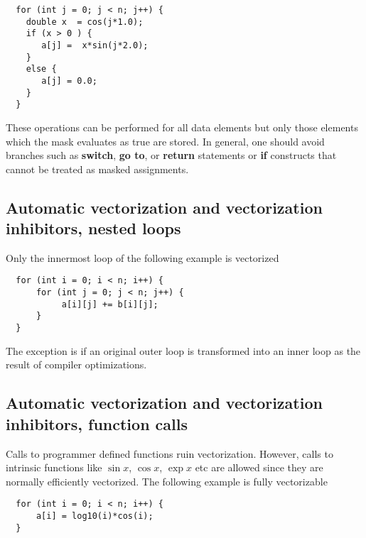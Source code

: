 \begin{verbatim}
  for (int j = 0; j < n; j++) {
    double x  = cos(j*1.0);
    if (x > 0 ) {
       a[j] =  x*sin(j*2.0); 
    }
    else {
       a[j] = 0.0;
    }
  }

\end{verbatim}

These operations can be performed for all data elements but only those elements which the mask evaluates as true are stored. In general, one should avoid branches such as \textbf{switch}, \textbf{go to}, or \textbf{return} statements or \textbf{if} constructs that cannot be treated as masked assignments. 

\subsection*{Automatic vectorization and vectorization inhibitors, nested loops}

Only the innermost loop of the following example is vectorized






\begin{verbatim}
  for (int i = 0; i < n; i++) {
      for (int j = 0; j < n; j++) {
           a[i][j] += b[i][j];
      }  
  }

\end{verbatim}

The exception is if an original outer loop is transformed into an inner loop as the result of compiler optimizations.

\subsection*{Automatic vectorization and vectorization inhibitors, function calls}

Calls to programmer defined functions ruin vectorization. However, calls to intrinsic functions like
$\sin{x}$, $\cos{x}$, $\exp{x}$ etc are allowed since they are normally efficiently vectorized. 
The following example is fully vectorizable




\begin{verbatim}
  for (int i = 0; i < n; i++) {
      a[i] = log10(i)*cos(i);
  }

\end{verbatim}

